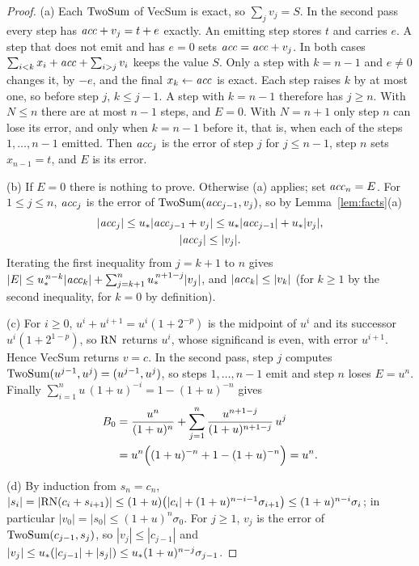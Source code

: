 \begin{proof}
(a) Each $\mathrm{TwoSum}$ of VecSum is exact, so $\sum_j v_j = S$. In the second pass every step has $\mathit{acc} + v_j = t + e$
exactly. An emitting step stores $t$ and carries $e$. A step that does not emit and has $e = 0$ sets $\mathit{acc} = \mathit{acc} +
v_j$. In both cases $\sum_{i<k} x_i + \mathit{acc} + \sum_{i>j} v_i$ keeps the value $S$. Only a step with $k = n-1$ and $e \ne
0$ changes it, by $-e$, and the final $x_k \gets \mathit{acc}$ is exact. Each step raises $k$ by at most one, so before step $j$,
$k \le j - 1$. A step with $k = n-1$ therefore has $j \ge n$. With $N \le n$ there are at most $n-1$ steps, and $E =
0$. With $N = n+1$ only step $n$ can lose its error, and only when $k = n-1$ before it, that is, when each of the steps
$1, \dots, n-1$ emitted. Then $\mathit{acc}_j$ is the error of step $j$ for $j \le n-1$, step $n$ sets $x_{n-1} = t$, and $E$
is its error.

(b) If $E = 0$ there is nothing to prove. Otherwise (a) applies; set $\mathit{acc}_n = E$. For $1 \le j \le n$, $\mathit{acc}_j$ is the
error of $\mathrm{TwoSum}(\mathit{acc}_{j-1}, v_j)$, so by Lemma~\ref{lem:facts}(a)
\begin{gather*}
|\mathit{acc}_j| \le u_{*}|\mathit{acc}_{j-1} + v_j| \le u_{*}|\mathit{acc}_{j-1}| + u_{*}|v_j|, \\
|\mathit{acc}_j| \le |v_j|.
\end{gather*}
Iterating the first inequality from $j = k+1$ to $n$ gives $|E| \le u_{*}^{\,n-k}|\mathit{acc}_k| + \sum_{j=k+1}^n
u_{*}^{\,n+1-j}|v_j|$, and $|\mathit{acc}_k| \le |v_k|$ (for $k \ge 1$ by the second inequality, for $k = 0$ by definition).

(c) For $i \ge 0$, $u^i + u^{i+1} = u^i(1 + 2^{-p})$ is the midpoint of $u^i$ and its successor $u^i(1 + 2^{1-p})$, so
$\mathrm{RN}$ returns $u^i$, whose significand is even, with error $u^{i+1}$. Hence VecSum returns $v = c$. In the second pass,
step $j$ computes $\mathrm{TwoSum}(u^{j-1}, u^j) = (u^{j-1}, u^j)$, so steps $1, \dots, n-1$ emit and step $n$ loses $E =
u^n$. Finally $\sum_{i=1}^n u\,(1+u)^{-i} = 1 - (1+u)^{-n}$ gives
\begin{align*}
B_0 &= \frac{u^n}{(1+u)^n} + \sum_{j=1}^{n}\frac{u^{n+1-j}}{(1+u)^{n+1-j}}\,u^j \\
&= u^n\Bigl((1+u)^{-n} + 1 - (1+u)^{-n}\Bigr) = u^n.
\end{align*}

(d) By induction from $s_n = c_n$, $|s_i| = |\mathrm{RN}(c_i + s_{i+1})| \le (1+u)\bigl(|c_i| + (1+u)^{n-i-1}\sigma_{i+1}\bigr)
\le (1+u)^{n-i}\sigma_i$; in particular $|v_0| = |s_0| \le (1+u)^n\sigma_0$. For $j \ge 1$, $v_j$ is the error of
$\mathrm{TwoSum}(c_{j-1}, s_j)$, so $|v_j| \le |c_{j-1}|$ and $|v_j| \le u_{*}(|c_{j-1}| + |s_j|) \le u_{*}(1+u)^{n-j}\sigma_{j-1}$.


\end{proof}
